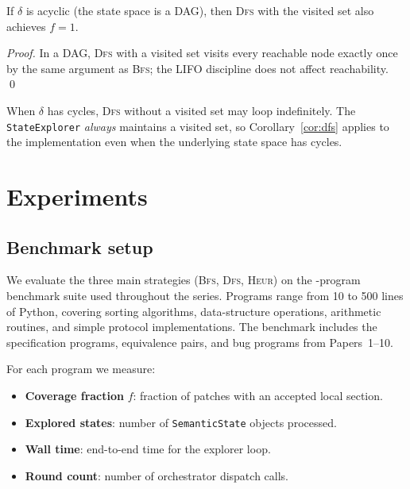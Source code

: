 \documentclass[11pt]{article}
\newcommand{\Trans}{\delta}                   %
\newcommand{\BFS}{\textsc{Bfs}}
\newcommand{\DFS}{\textsc{Dfs}}
\newcommand{\HEUR}{\textsc{Heur}}
\newcommand{\covfrac}{f}                      %
\begin{document}
\begin{corollary}\label{cor:dfs}
If $\Trans$ is acyclic (the state space is a DAG), then \DFS{} with
the visited set also achieves $\covfrac = 1$.
\end{corollary}

\begin{proof}
In a DAG, \DFS{} with a visited set visits every reachable node exactly
once by the same argument as \BFS{}; the LIFO discipline does not affect
reachability. \qed
\end{proof}

\begin{remark}
When $\Trans$ has cycles, \DFS{} without a visited set may loop
indefinitely.  The \texttt{StateExplorer} \emph{always} maintains a
visited set, so Corollary~\ref{cor:dfs} applies to the implementation
even when the underlying state space has cycles.
\end{remark}

\section{Experiments}\label{sec:experiments}

\subsection{Benchmark setup}

We evaluate the three main strategies (\BFS{}, \DFS{}, \HEUR{}) on the
\numcases{}-program benchmark suite used throughout the \JuGeo{} series.
Programs range from 10 to 500 lines of Python, covering sorting
algorithms, data-structure operations, arithmetic routines, and simple
protocol implementations.  The benchmark includes the \numspec{}
specification programs, \numeq{} equivalence pairs, and \numbug{} bug
programs from Papers~1--10.

For each program we measure:
\begin{itemize}
  \item \textbf{Coverage fraction} $\covfrac$: fraction of patches with
    an accepted local section.
  \item \textbf{Explored states}: number of \texttt{SemanticState}
    objects processed.
  \item \textbf{Wall time}: end-to-end time for the explorer loop.
  \item \textbf{Round count}: number of orchestrator dispatch calls.
\end{itemize}
\end{document}
